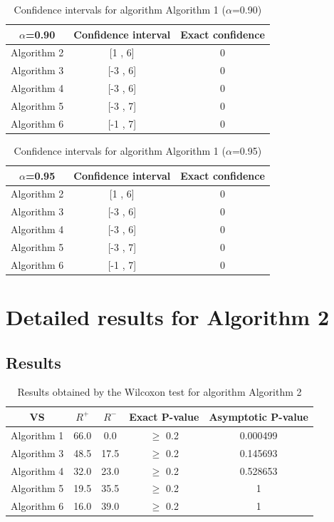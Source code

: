 \documentclass[a4paper,10pt]{article}
\begin{document}
\begin{table}[!htp]
\centering\small
\begin{tabular}{
|c|c|c|}
\hline
 $\alpha$=0.90 & Confidence interval & Exact confidence \\ \hline 
Algorithm 2 & [1 , 6] & 0\\ \hline 
Algorithm 3 & [-3 , 6] & 0\\ \hline 
Algorithm 4 & [-3 , 6] & 0\\ \hline 
Algorithm 5 & [-3 , 7] & 0\\ \hline 
Algorithm 6 & [-1 , 7] & 0\\ \hline 

\end{tabular}
\caption{Confidence intervals for algorithm Algorithm 1 ($\alpha$=0.90)}
\end{table}
\begin{table}[!htp]
\centering\small
\begin{tabular}{
|c|c|c|}
\hline
 $\alpha$=0.95 & Confidence interval & Exact confidence \\ \hline 
Algorithm 2 & [1 , 6] & 0\\ \hline 
Algorithm 3 & [-3 , 6] & 0\\ \hline 
Algorithm 4 & [-3 , 6] & 0\\ \hline 
Algorithm 5 & [-3 , 7] & 0\\ \hline 
Algorithm 6 & [-1 , 7] & 0\\ \hline 

\end{tabular}
\caption{Confidence intervals for algorithm Algorithm 1 ($\alpha$=0.95)}
\end{table}

 \clearpage 


\section{Detailed results for Algorithm 2}


\subsection{Results}

\begin{table}[!htp]
\centering\small
\begin{tabular}{
|c|c|c|c|c|}
\hline
 VS & $R^{+}$ & $R^{-}$ & Exact P-value & Asymptotic P-value \\ \hline 
Algorithm 1 & 66.0 & 0.0 & $\geq$ 0.2 & 0.000499\\ \hline 
Algorithm 3 & 48.5 & 17.5 & $\geq$ 0.2 & 0.145693\\ \hline 
Algorithm 4 & 32.0 & 23.0 & $\geq$ 0.2 & 0.528653\\ \hline 
Algorithm 5 & 19.5 & 35.5 & $\geq$ 0.2 & 1\\ \hline 
Algorithm 6 & 16.0 & 39.0 & $\geq$ 0.2 & 1\\ \hline 

\end{tabular}
\caption{Results obtained by the Wilcoxon test for algorithm Algorithm 2}
\end{table}
\end{document}
